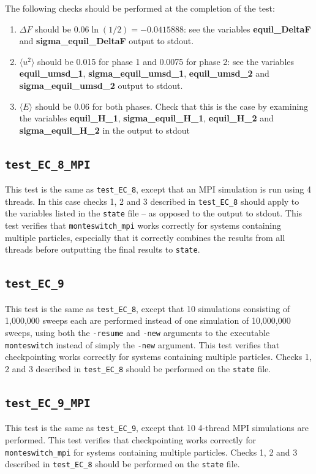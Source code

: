 \documentclass{report}
\begin{document}
The following checks should be performed at the completion of the test:
\begin{enumerate}
\item
$\Delta F$ should be $0.06\ln(1/2)=-0.0415888$:  see the variables \textbf{equil\_DeltaF} and \textbf{sigma\_equil\_DeltaF} output
to stdout.
\item
$\langle u^2\rangle$ should be 0.015 for phase 1 and 0.0075 for phase 2: see the 
variables \textbf{equil\_umsd\_1}, \textbf{sigma\_equil\_umsd\_1}, \textbf{equil\_umsd\_2} and \textbf{sigma\_equil\_umsd\_2} output to
stdout.
\item
$\langle E\rangle$ should be 0.06 for both phases. Check that this
is the case by examining the variables \textbf{equil\_H\_1}, \textbf{sigma\_equil\_H\_1}, \textbf{equil\_H\_2} and \textbf{sigma\_equil\_H\_2}
in the output to stdout
\end{enumerate}


\subsection{\texttt{test\_EC\_8\_MPI}}
This test is the same as \texttt{test\_EC\_8}, except that an MPI simulation is run using 4 threads.  In this case checks
1, 2 and 3 described in \texttt{test\_EC\_8} should apply to the variables listed in the \texttt{state} file -- as opposed to the output to
stdout. This test verifies that \texttt{monteswitch\_mpi} works correctly for systems containing multiple particles, especially that it correctly
combines the results from all threads before outputting the final results to \texttt{state}.


\subsection{\texttt{test\_EC\_9}}
This test is the same as \texttt{test\_EC\_8}, except that 10 simulations consisting of 1,000,000 sweeps each are performed
instead of one simulation of 10,000,000 sweeps, using both the \texttt{-resume} and \texttt{-new} arguments to the executable 
\texttt{monteswitch} instead of simply the \texttt{-new} argument. This test verifies that checkpointing works
correctly for systems containing multiple particles. Checks 1, 2 and 3 described in \texttt{test\_EC\_8} should be performed on the \texttt{state} file.


\subsection{\texttt{test\_EC\_9\_MPI}}
This test is the same as \texttt{test\_EC\_9}, except that 10 4-thread MPI simulations are performed. This test verifies 
that checkpointing works correctly for \texttt{monteswitch\_mpi} for systems containing multiple particles. 
Checks 1, 2 and 3 described in \texttt{test\_EC\_8} should be performed on the \texttt{state} file.
\end{document}
